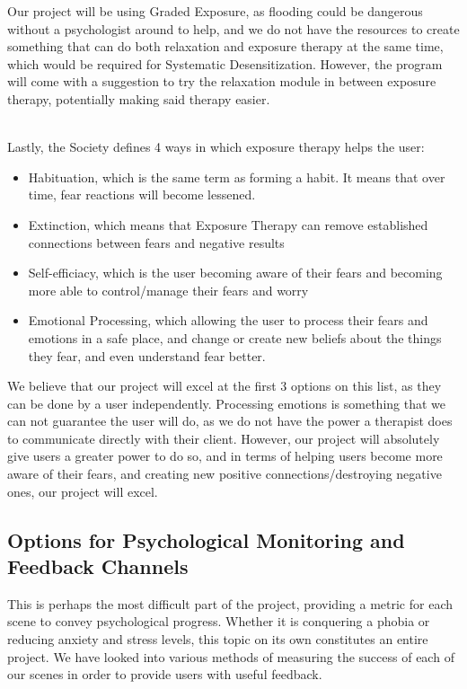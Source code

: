 \documentclass[a4paper,10pt]{article}
\begin{document}
Our project will be using Graded Exposure, as flooding could be dangerous without a psychologist around to help, and we do not have the resources to create something that can do both relaxation and exposure therapy at the same time, which would be required for Systematic Desensitization. However, the program will come with a suggestion to try the relaxation module in between exposure therapy, potentially making said therapy easier.
\par~\\ 
Lastly, the Society defines 4 ways in which exposure therapy helps the user:
\begin{itemize}
	\item Habituation, which is the same term as forming a habit.  It means that over time, fear reactions will become lessened.
	\item Extinction, which means that Exposure Therapy can remove established connections between fears and negative results
	\item Self-efficiacy, which is the user becoming aware of their fears and becoming more able to control/manage their fears and worry
	\item Emotional Processing, which allowing the user to process their fears and emotions in a safe place, and change or create new beliefs about the things they fear, and even understand fear better.
\end{itemize}

We believe that our project will excel at the first 3 options on this list, as they can be done by a user independently.  Processing emotions is something that we can not guarantee the user will do, as we do not have the power a therapist does to communicate directly with their client.  However, our project will absolutely give users a greater power to do so, and in terms of helping users become more aware of their fears, and creating new positive connections/destroying negative ones, our project will excel. \cite{exposeTherapy}


\pagebreak

\pagebreak
\subsection{Options for Psychological Monitoring and Feedback Channels}
This is perhaps the most difficult part of the project, providing a metric for each scene to convey psychological progress. Whether it is conquering a phobia or reducing anxiety and stress levels, this topic on its own constitutes an entire project. We have looked into various methods of measuring the success of each of our scenes in order to provide users with useful feedback.
\end{document}
